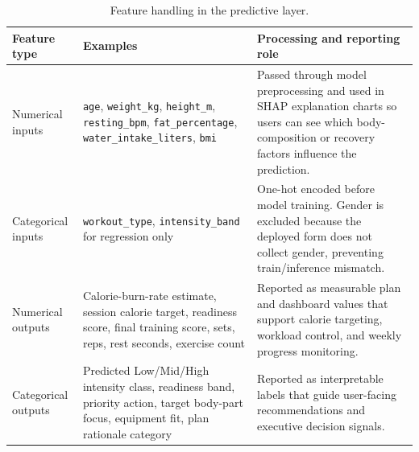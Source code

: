 \documentclass{aitthesis}
\begin{document}
\begin{table}[htbp]
\centering
\small
\caption{Feature handling in the predictive layer.}
\label{tab:feature_types}
\begin{tabularx}{\linewidth}{p{3cm}p{4.4cm}X}
\toprule
\textbf{Feature type} & \textbf{Examples} & \textbf{Processing and reporting role} \\
\midrule
Numerical inputs & \texttt{age}, \texttt{weight\_kg}, \texttt{height\_m}, \texttt{resting\_bpm}, \texttt{fat\_percentage}, \texttt{water\_intake\_liters}, \texttt{bmi} & Passed through model preprocessing and used in SHAP explanation charts so users can see which body-composition or recovery factors influence the prediction. \\[10pt]
Categorical inputs & \texttt{workout\_type}, \texttt{intensity\_band} for regression only & One-hot encoded before model training. Gender is excluded because the deployed form does not collect gender, preventing train/inference mismatch. \\[10pt]
Numerical outputs & Calorie-burn-rate estimate, session calorie target, readiness score, final training score, sets, reps, rest seconds, exercise count & Reported as measurable plan and dashboard values that support calorie targeting, workload control, and weekly progress monitoring. \\[10pt]
Categorical outputs & Predicted Low/Mid/High intensity class, readiness band, priority action, target body-part focus, equipment fit, plan rationale category & Reported as interpretable labels that guide user-facing recommendations and executive decision signals. \\
\bottomrule
\end{tabularx}
\end{table}
\end{document}
